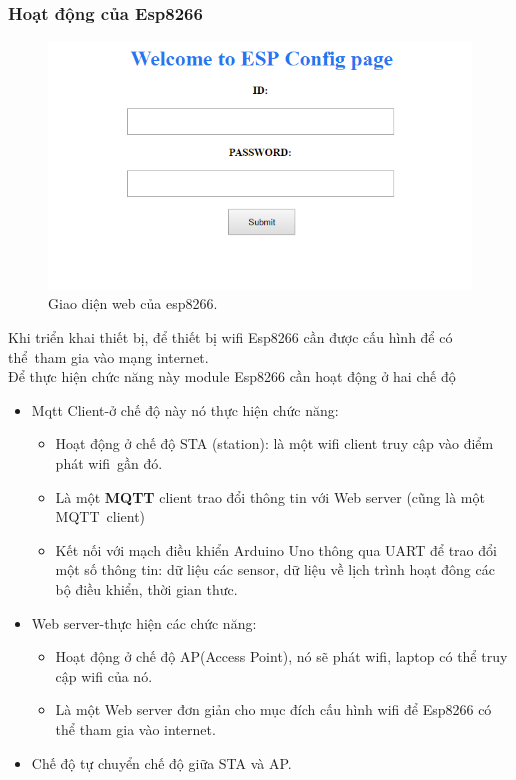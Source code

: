 \documentclass[a4paper,12pt,oneside]{article}
\begin{document}
\subsubsection{Hoạt động của Esp8266}
\begin{figure}[H]
\begin{center}
\includegraphics[scale=0.9]{hinh/espweb.png}
\end{center}
\caption{Giao diện web của esp8266.}
\end{figure}
\noindent Khi triển khai thiết bị, để thiết bị wifi Esp8266 cần được cấu hình để có thể\
tham gia vào mạng internet.\\
Để thực hiện chức năng này module Esp8266 cần hoạt động ở hai chế độ
\begin{itemize}
\item Mqtt Client-ở chế độ này nó thực hiện chức năng:
\begin{itemize}
\item Hoạt động ở chế độ STA (station): là một wifi client truy cập vào điểm phát wifi\
gần đó.
\item Là một \textbf{MQTT} client trao đổi thông tin với Web server (cũng là một MQTT\
client)
\item Kết nối với mạch điều khiển Arduino Uno thông qua UART để trao đổi một số thông tin: dữ liệu các sensor, dữ liệu về lịch trình hoạt đông các bộ điều khiển, thời gian thưc.
\end{itemize}
\item Web server-thực hiện các chức năng:
\begin{itemize}
\item Hoạt động ở chế độ AP(Access Point), nó sẽ phát wifi, laptop có thể truy cập wifi của nó.
\item Là một Web server đơn giản cho mục đích cấu hình wifi để Esp8266 có thể tham gia vào internet.
\end{itemize}
\item Chế độ tự chuyển chế độ giữa STA và AP.
\end{itemize}
\end{document}
